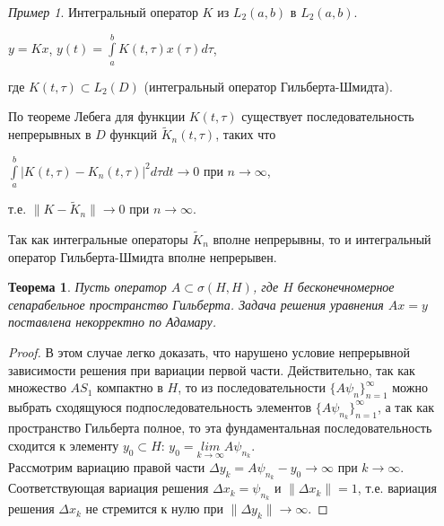 \documentclass[12pt,a4paper,titlepage]{book}
\theoremstyle{definition}
\theoremstyle{plain}
\newtheorem*{theorem}{Теорема}
\theoremstyle{remark}
\theoremstyle{remark}
\newtheorem*{example}{Пример}
\theoremstyle{remark}
\theoremstyle{plain}
\begin{document}
\begin{example}Интегральный оператор $K$ из $L_2(a,b)$ в $L_2(a,b)$.
\begin{center}
$y=Kx$, $y(t)=\int\limits_a^b K(t, \tau)x(\tau)d\tau $,
\end{center}
где $K(t, \tau)\subset L_2(D)$ (интегральный оператор Гильберта-Шмидта).

По теореме Лебега для функции $K(t, \tau)$ существует последовательность непрерывных в $D$ функций $\widetilde{K}_n (t, \tau)$, таких что
\begin{center}
$\int\limits_a^b |K(t, \tau)-K_n(t, \tau)|^2d\tau dt \rightarrow 0$ при $n\rightarrow \infty$,
\end{center}
\begin{center}
т.е. $\lVert K-\widetilde{K}_n \rVert \rightarrow 0$ при $n\rightarrow \infty$.
\end{center}

Так как интегральные операторы $\widetilde{K}_n$ вполне непрерывны, то и интегральный оператор Гильберта-Шмидта вполне непрерывен.
\end{example}
\begin{theorem}Пусть оператор $A \subset \sigma (H,H)$, где $H$ бесконечномерное сепарабельное пространство Гильберта. Задача решения уравнения $Ax=y$ поставлена некорректно по Адамару.
\end{theorem}
\begin{proof}В этом случае легко доказать, что нарушено условие непрерывной зависимости решения при вариации первой части. Действительно, так как множество $AS_1$ компактно в $H$, то из последовательности $\lbrace A \psi_n\rbrace_{n=1}^{\infty}$ можно выбрать сходящуюся подпоследовательность элементов $\lbrace A \psi_{n_k}\rbrace_{n=1}^{\infty}$, а так как пространство Гильберта полное, то эта фундаментальная последовательность сходится к элементу $y_0 \subset H$: $y_0=\underset{k \rightarrow \infty}{lim} A \psi_{n_k}$.\\
Рассмотрим вариацию правой части $\Delta y_k=A \psi_{n_k}-y_0 \rightarrow \infty$ при $k\rightarrow \infty$. Соответствующая вариация решения $\Delta x_k=\psi_{n_k}$ и $\lVert\Delta x_k \rVert=1$, т.е. вариация решения $\Delta x_k$ не стремится к нулю при $\lVert\Delta y_k \rVert \rightarrow \infty$.

\end{proof}
\end{document}
